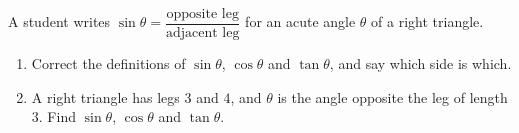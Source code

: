 A student writes $\sin\theta=\dfrac{\text{opposite leg}}{\text{adjacent leg}}$ for an acute angle $\theta$ of a right triangle.
\begin{enumerate}
\item[(a)] Correct the definitions of $\sin\theta$, $\cos\theta$ and $\tan\theta$, and say which side is which.
\item[(b)] A right triangle has legs $3$ and $4$, and $\theta$ is the angle opposite the leg of length $3$. Find $\sin\theta$, $\cos\theta$ and $\tan\theta$.
\end{enumerate}
